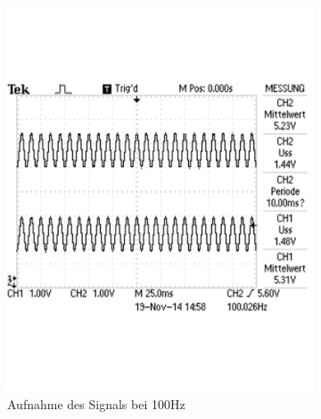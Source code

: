 \documentclass[12pt,a4paper]{article}
\begin{document}
\begin{figure}[H]
        \centering
        \begin{subfigure}[b]{0.28\textwidth}
                \includegraphics[width=\textwidth , scale = 0.4]{2_2_100.pdf}
                \caption[Aufnahme des Signals bei 100Hz]{Aufnahme des Signals bei 100Hz}
                \label{fig:2_2_100}
        \end{subfigure}%
        \hfill
        \begin{subfigure}[b]{0.28\textwidth}

\end{subfigure}
\end{figure}
\end{document}
